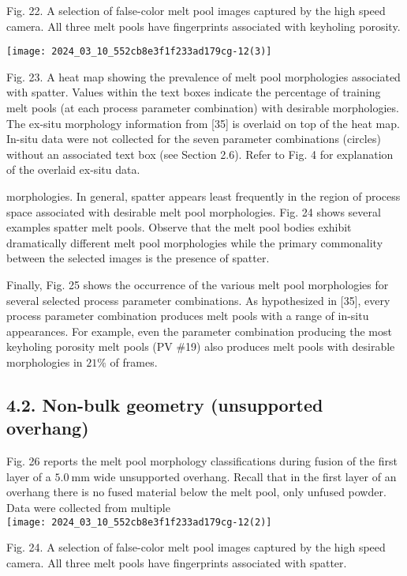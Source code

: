 \documentclass[10pt]{article}
\begin{document}
Fig. 22. A selection of false-color melt pool images captured by the high speed camera. All three melt pools have fingerprints associated with keyholing porosity.

\begin{center}
\texttt{[image: 2024\_03\_10\_552cb8e3f1f233ad179cg-12(3)]}
\end{center}

Fig. 23. A heat map showing the prevalence of melt pool morphologies associated with spatter. Values within the text boxes indicate the percentage of training melt pools (at each process parameter combination) with desirable morphologies. The ex-situ morphology information from [35] is overlaid on top of the heat map. In-situ data were not collected for the seven parameter combinations (circles) without an associated text box (see Section 2.6). Refer to Fig. 4 for explanation of the overlaid ex-situ data.

morphologies. In general, spatter appears least frequently in the region of process space associated with desirable melt pool morphologies. Fig. 24 shows several examples spatter melt pools. Observe that the melt pool bodies exhibit dramatically different melt pool morphologies while the primary commonality between the selected images is the presence of spatter.

Finally, Fig. 25 shows the occurrence of the various melt pool morphologies for several selected process parameter combinations. As hypothesized in [35], every process parameter combination produces melt pools with a range of in-situ appearances. For example, even the parameter combination producing the most keyholing porosity melt pools (PV \#19) also produces melt pools with desirable morphologies in $21 \%$ of frames.

\subsection*{4.2. Non-bulk geometry (unsupported overhang)}
Fig. 26 reports the melt pool morphology classifications during fusion of the first layer of a $5.0 \mathrm{~mm}$ wide unsupported overhang. Recall that in the first layer of an overhang there is no fused material below the melt pool, only unfused powder. Data were collected from multiple\\
\texttt{[image: 2024\_03\_10\_552cb8e3f1f233ad179cg-12(2)]}

Fig. 24. A selection of false-color melt pool images captured by the high speed camera. All three melt pools have fingerprints associated with spatter.
\end{document}
